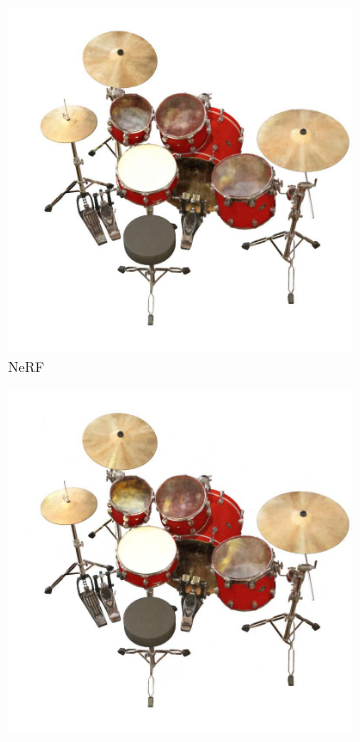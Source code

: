 \documentclass[12pt, a4paper, twoside]{book}
\numberwithin{equation}{chapter}
\numberwithin{theorem}{section}
\numberwithin{definition}{section}
\numberwithin{definitionChapter}{chapter}
\begin{document}
	\begin{figure}[H]
		\centering
		\begin{subfigure}{0.3\textwidth}
			\centering
			\includegraphics[scale=0.2]{img/nerf/nerf_drums_3.jpg}
			\caption{NeRF}
		\end{subfigure}
		\begin{subfigure}{0.3\textwidth}
			\centering
			\includegraphics[scale=0.2]{img/mipnerf/mipnerf_drums_3.jpg}

\end{subfigure}
\end{figure}
\end{document}
